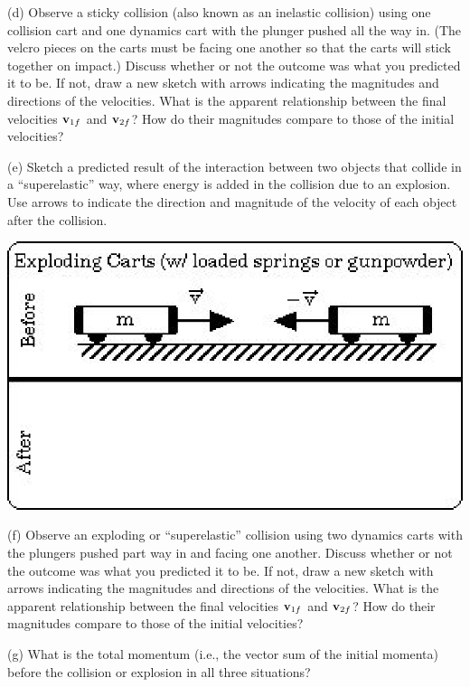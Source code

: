 (d) Observe a sticky collision (also known as an inelastic collision) using one collision cart and one dynamics cart with the plunger pushed all the way in. (The velcro pieces on the carts must be facing one another so that the carts will stick together on impact.) Discuss
whether or not the outcome was what you predicted it to be. If not, draw a new
sketch with arrows indicating the magnitudes and directions of the velocities.
What is the apparent relationship between the final velocities \( {{\bf v}_{1f}} \) and \( {{\bf v}_{2f}} \)? How do their magnitudes compare to those
of the initial velocities?
\answerspace{15mm}

(e) Sketch a predicted result of the interaction between two objects that 
collide in a ``superelastic'' way, where energy is added in the collision due 
to an explosion. Use arrows to indicate the direction and magnitude of the
velocity of each object after the collision.

\vspace{0.3cm}
{\par\centering \includegraphics[scale=0.9]{mom_cons/mom_cons_fig5.eps} \par}
\vspace{0.3cm}

(f) Observe an exploding or ``superelastic'' collision using two dynamics carts with the plungers pushed part way in and facing one another. Discuss
whether or not the outcome was what you predicted it to be. If not, draw a new
sketch with arrows indicating the magnitudes and directions of the velocities.
What is the apparent relationship between the final velocities \( {{\bf v}_{1f}} \) and \( {{\bf v}_{2f}} \)? How do their magnitudes compare to those
of the initial velocities?
\answerspace{15mm}

\pagebreak[2]
(g) What is the total momentum (i.e., the vector sum of the initial momenta)
before the collision or explosion in all three situations?
\vspace{20mm}

